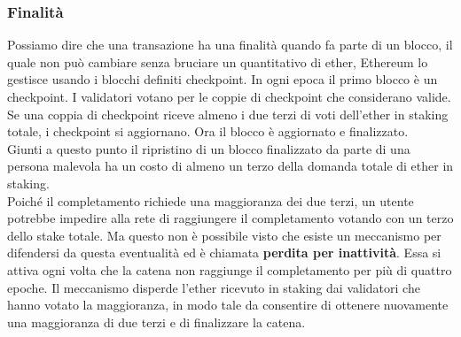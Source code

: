 \documentclass[a4paper,11pt]{report}
\begin{document}
\subsubsection{Finalità}
Possiamo dire che una transazione ha una finalità quando fa parte di un blocco, il quale non può cambiare senza bruciare un quantitativo di ether, Ethereum lo gestisce usando i blocchi definiti checkpoint. In ogni epoca il primo blocco è un checkpoint. I validatori votano per le coppie di checkpoint che considerano valide. Se una coppia di checkpoint riceve almeno i due terzi di voti dell'ether in staking totale, i checkpoint  si aggiornano. Ora il blocco è aggiornato e finalizzato.\\
Giunti a questo punto il ripristino di un blocco finalizzato da parte di una persona malevola ha un costo di almeno un terzo della domanda totale di ether in staking.\\
Poiché il completamento richiede una maggioranza dei due terzi, un utente potrebbe impedire alla rete di raggiungere il completamento votando con un terzo dello stake totale. Ma questo non è possibile visto che esiste un meccanismo per difendersi da questa eventualità ed è chiamata \textbf{perdita per inattività}. Essa si attiva ogni volta che la catena non raggiunge il completamento per più di quattro epoche. Il meccanismo disperde l'ether ricevuto in staking dai validatori che hanno votato la maggioranza, in modo tale da consentire di ottenere nuovamente una maggioranza di due terzi e di finalizzare la catena.
\end{document}
